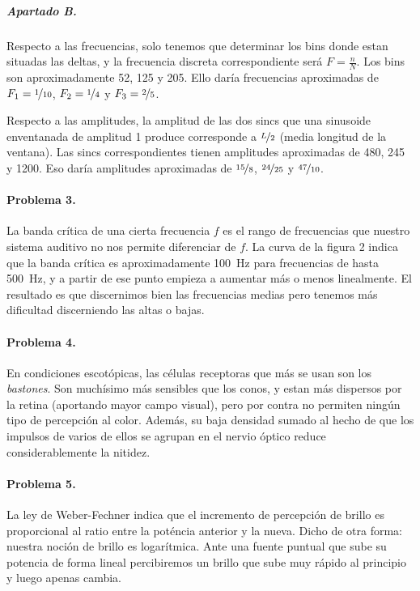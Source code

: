 \subparagraph{Apartado B.}

Respecto a las frecuencias, solo tenemos que determinar los bins donde estan
situadas las deltas, y la frecuencia discreta correspondiente será
$F = \frac{n}{N}$. Los bins son aproximadamente \num{52}, \num{125} y \num{205}.
Ello daría frecuencias aproximadas de $F_1 = \nicefrac{1}{10}$, $F_2 = \nicefrac{1}{4}$ y $F_3 = \nicefrac{2}{5}$.

Respecto a las amplitudes, la amplitud de las dos sincs que una sinusoide
enventanada de amplitud 1 produce corresponde a $\nicefrac{L}{2}$ (media
longitud de la ventana). Las sincs correspondientes tienen amplitudes
aproximadas de \num{480}, \num{245} y \num{1200}. Eso daría amplitudes
aproximadas de $\nicefrac{15}{8}$, $\nicefrac{24}{25}$ y $\nicefrac{47}{10}$.

\finishpage


\startpage
\paragraph{Problema 3.}

La banda crítica de una cierta frecuencia $f$ es el rango de frecuencias que nuestro sistema auditivo no nos permite diferenciar de $f$. La curva de la
figura 2 indica que la banda crítica es aproximadamente \SI{100}{\hertz} para
frecuencias de hasta \SI{500}{\hertz}, y a partir de ese punto empieza a
aumentar más o menos linealmente. El resultado es que discernimos bien las
frecuencias medias pero tenemos más dificultad discerniendo las altas o bajas.

\paragraph{Problema 4.}

En condiciones escotópicas, las células receptoras que más se usan son los
\emph{bastones}. Son muchísimo más sensibles que los conos, y estan más
dispersos por la retina (aportando mayor campo visual), pero por contra no
permiten ningún tipo de percepción al color. Además, su baja densidad sumado
al hecho de que los impulsos de varios de ellos se agrupan en el nervio óptico
reduce considerablemente la nitidez.

\paragraph{Problema 5.}

La ley de Weber-Fechner indica que el incremento de percepción de brillo es
proporcional al ratio entre la poténcia anterior y la nueva. Dicho de otra
forma: nuestra noción de brillo es logarítmica. Ante una fuente puntual que sube
su potencia de forma lineal percibiremos un brillo que sube muy rápido al
principio y luego apenas cambia.


